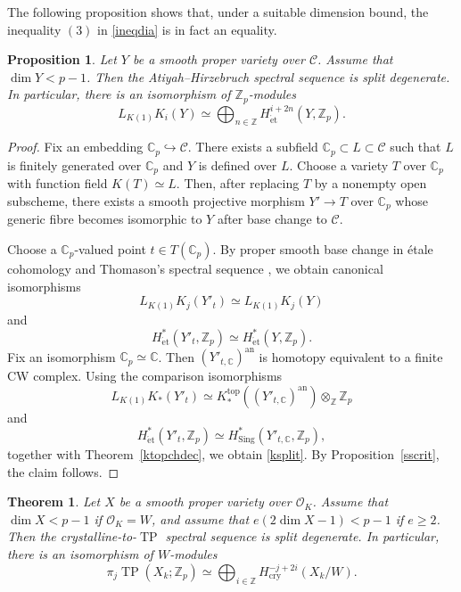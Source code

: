 \documentclass[11pt]{amsart}
\newtheorem{thm}[lemma]{Theorem}
\newtheorem{prop}[lemma]{Proposition}
\numberwithin{equation}{section}
\newcommand{\Z}{\mathbb{Z}}
\newcommand{\sC}{\mathcal{C}}
\newcommand{\sO}{\mathcal{O}}
\newcommand{\an}{\operatorname{an}}
\newcommand{\Sing}{\operatorname{{Sing}}}
\newcommand{\et}{{\operatorname{\acute{e}t}}}
\newcommand{\bC}{\mathbb{C}}
\newcommand{\cry}{\operatorname{cry}}
\numberwithin{equation}{section}
\newcommand{\TP}{\operatorname{TP}}
\newcommand{\LK}{{L_{K(1)}}}
\begin{document}
The following proposition shows that, under a suitable dimension bound, the inequality $(3)$ in \eqref{ineqdia} is in fact an equality.

\begin{prop}\label{kdeg}
Let $Y$ be a smooth proper variety over $\sC$. Assume that $\dim Y<p-1$. Then the Atiyah--Hirzebruch spectral sequence is split degenerate. In particular, there is an isomorphism of $\Z_p$-modules
\begin{equation}\label{ksplit}
\LK K_i(Y) \simeq \bigoplus_{n\in\Z} H_{\et}^{i+2n}(Y,\Z_p).
\end{equation}
\end{prop}

\begin{proof}
Fix an embedding $\bC_p \hookrightarrow \sC$. There exists a subfield $\bC_p \subset L \subset \sC$ such that $L$ is finitely generated over $\bC_p$ and $Y$ is defined over $L$. Choose a variety $T$ over $\bC_p$ with function field $K(T)\simeq L$. Then, after replacing $T$ by a nonempty open subscheme, there exists a smooth projective morphism $Y' \to T$ over $\bC_p$ whose generic fibre becomes isomorphic to $Y$ after base change to $\sC$.

Choose a $\bC_p$-valued point $t\in T(\bC_p)$. By proper smooth base change in \'etale cohomology and Thomason's spectral sequence \cite{T85}, we obtain canonical isomorphisms
\[
\LK K_j(Y'_t)\simeq \LK K_j(Y)
\]
and
\[
H_{\et}^{*}(Y'_t,\Z_p)\simeq H_{\et}^{*}(Y,\Z_p).
\]
Fix an isomorphism $\bC_p \simeq \bC$. Then $(Y'_{t,\bC})^{\an}$ is homotopy equivalent to a finite CW complex. Using the comparison isomorphisms
\[
\LK K_*(Y'_t)\simeq K^{\mathrm{top}}_*((Y'_{t,\bC})^{\an})\otimes_{\Z}\Z_p
\]
and
\[
H_{\et}^{*}(Y'_t,\Z_p)\simeq H_{\Sing}^{*}(Y'_{t,\bC},\Z_p),
\]
together with Theorem~\ref{ktopchdec}, we obtain \eqref{ksplit}. By Proposition~\ref{sscrit}, the claim follows.
\end{proof}

\begin{thm}\label{crydege}
Let $X$ be a smooth proper variety over $\sO_K$. Assume that $\dim X<p-1$ if $\sO_K=W$, and assume that $e(2\dim X-1)<p-1$ if $e\geq 2$. Then the crystalline-to-$\TP$ spectral sequence is split degenerate. In particular, there is an isomorphism of $W$-modules
\[
\pi_j\TP(X_k;\Z_p) \simeq \bigoplus_{i\in\Z} H_{\cry}^{-j+2i}(X_k/W).
\]
\end{thm}
\end{document}

